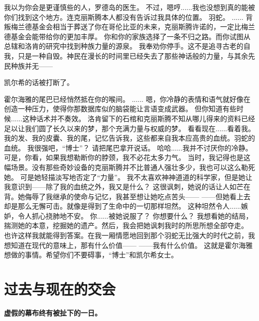\documentclass[openany]{book}
\begin{document}
\begin{dialogue}
     我以为你会是更谨慎些的人，罗德岛的医生。
     不过，嗯哼......我也没想到真的能被你们找到这个地方。连克丽斯腾本人都没有告诉过我具体的位置。
     羽蛇。
     ......
     背叛梅兰德基金会相当于葬送了你在哥伦比亚的未来，克丽斯腾许诺的，一定比梅兰德基金会能带给你的更加丰厚。
     你和你的家族选择了一条不归之路。而你试图从总辖和洛肯的研究中找到种族力量的源泉。
     我奉劝你停手。这不是追寻古老的自我，只是一种自毁。神民在漫长的时间里已经失去了那些神话般的力量，与其余先民种族并无——\par
    凯尔希的话被打断了。\par
    霍尔海雅的尾巴已经悄然抵在你的喉间。
     ......
     嗯，你冷静的表情和语气就好像在创造一种压力，使得你那数据库似的脑袋能让言语变成武器。
     但你知道有些时候......这种话术并不奏效。
     洛肯留下的石棺和克丽斯腾不知从哪儿得来的资料已经足以让我们圆了长久以来的梦，那个充满力量与权威的梦。
     看看现在......看着我。我的发、我的皮囊、我的尾，记忆告诉我，这些都来自我本应高贵的血统。羽蛇的血统。
     我很强吧，“博士”？
     请把尾巴拿开说话。
     哈哈......我并不讨厌你的冷静。可是，你看，如果我想勒断你的脖颈，我不必花太多力气。
     当时，我记得也是这幅场景。没有那些奇妙设备的克丽斯腾并不比普通人强壮多少，我也可以这么勒死她。
     可是她轻描淡写地否定了“力量”。
     我不太喜欢神神道道的科学家，但是她让我意识到——除了我的血统之外，我又是什么？
     这很讽刺，她说的话让人如芒在背。她侮辱了我继承的使命与记忆，我甚至想让她吃点苦头——
     ——但她看上去却是那么无懈可击。就像是得到了生命中的一切那样坦然。
     这种坦然令人......嫉妒，令人抓心挠肺地不安。
     你......被她说服了？
     你想要什么？
     我想看她的结局，揣测她的本意，挖掘她的遗产。然后，我会把她讽刺我时的所思所想全部夺走。
     也许这样我就能得到答案。在我一厢情愿地回到那个羽蛇无比强大的时代之前，我想知道在现代的意味上，那有什么价值——
     ——我有什么价值。
     这就是霍尔海雅想做的事情。希望你们不要碍事，“博士”和凯尔希女士。
\end{dialogue}

\chapter{过去与现在的交会}
\begin{center} \textbf{虚假的幕布终有被扯下的一日。}\end{center} \par
\clearpage
\end{document}
